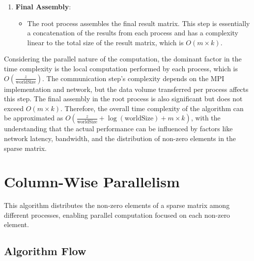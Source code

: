 \documentclass[12pt,oneside]{book} %
\begin{document}
\begin{enumerate}
    \item \textbf{Final Assembly}:
          \begin{itemize}
              \item The root process assembles the final result matrix. This step is essentially a
                    concatenation of the results from each process and has a complexity linear to
                    the total size of the result matrix, which is \( O(m \times k) \).
          \end{itemize}
\end{enumerate}

Considering the parallel nature of the computation, the dominant factor in the
time complexity is the local computation performed by each process, which is \(
O\left(\frac{z}{\text{worldSize}}\right) \). The communication step's
complexity depends on the MPI implementation and network, but the data volume
transferred per process affects this step. The final assembly in the root
process is also significant but does not exceed \( O(m \times k) \). Therefore,
the overall time complexity of the algorithm can be approximated as \(
O\left(\frac{z}{\text{worldSize}} + \log(\text{worldSize}) + m \times k\right)
\), with the understanding that the actual performance can be influenced by
factors like network latency, bandwidth, and the distribution of non-zero
elements in the sparse matrix.

\newpage
\section{Column-Wise Parallelism}
This algorithm distributes the non-zero elements of a sparse matrix among
different processes, enabling parallel computation focused on each non-zero
element.

\subsection{Algorithm Flow}
\end{document}
